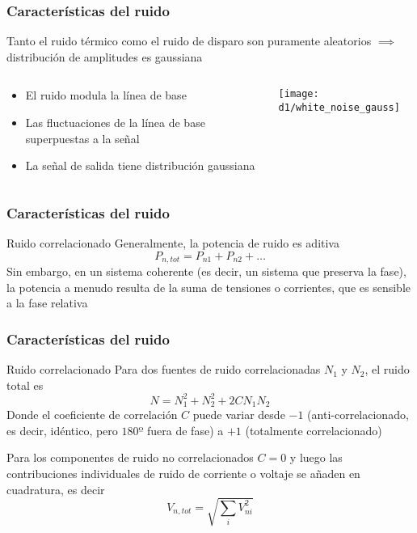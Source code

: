 \documentclass{beamer}
\begin{document}
\begin{frame}
\frametitle{Características del ruido}
\begin{block}{}
Tanto el ruido térmico como el ruido de disparo son puramente aleatorios $\implies$ 
distribución de amplitudes es gaussiana
\end{block}
\begin{columns}
\begin{column}{0.5\textwidth}
\begin{block}{}
\begin{itemize}
\item El ruido modula la línea de base
\item Las fluctuaciones de la línea de base superpuestas a la señal
\item La señal de salida tiene distribución gaussiana
\end{itemize}
\end{block}
\end{column}
\begin{column}{0.5\textwidth}
\texttt{[image: d1/white\_noise\_gauss]}
\end{column}
\end{columns}
\end{frame} 

\begin{frame}
\frametitle{Características del ruido}
\begin{block}{Ruido correlacionado}
Generalmente, la potencia de ruido es aditiva
$$P_{n,tot} = P_{n1} + P_{n2} + \ldots$$
Sin embargo, en un sistema coherente (es decir, un sistema que preserva la fase), 
la potencia a menudo resulta de la suma de tensiones o corrientes, que es 
sensible a la fase relativa
\end{block}
\end{frame} 

\begin{frame}
\frametitle{Características del ruido}
\begin{block}{Ruido correlacionado}
Para dos fuentes de ruido correlacionadas $N_1$ y $N_2$, el ruido total es
$$N = N_1^2 + N_2^2 + 2CN_1N_2$$
Donde el coeficiente de correlación $C$ puede variar desde \alert{$-1$} (anti-correlacionado, 
es decir, idéntico, pero $180º$ fuera de fase) a \alert{$+1$} (totalmente correlacionado)

\vspace{2mm}
Para los componentes de ruido no correlacionados $C = 0$ y luego las contribuciones 
individuales de ruido de corriente o voltaje se añaden en cuadratura, es decir
$$V_{n,tot} = \sqrt{\sum_i V_{ni}^2}$$
\end{block}
\end{frame} 
\end{document}
